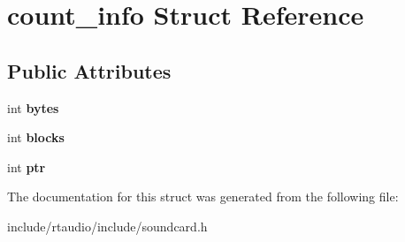 \hypertarget{structcount__info}{}\section{count\+\_\+info Struct Reference}
\label{structcount__info}
\subsection*{Public Attributes}
\begin{DoxyCompactItemize}
\item 
int {\bfseries bytes}\hypertarget{structcount__info_a42e374aa171d142b5d193657cecd6e71}{}\label{structcount__info_a42e374aa171d142b5d193657cecd6e71}

\item 
int {\bfseries blocks}\hypertarget{structcount__info_a181d111d2f9fae6da22c0498a606096b}{}\label{structcount__info_a181d111d2f9fae6da22c0498a606096b}

\item 
int {\bfseries ptr}\hypertarget{structcount__info_ad771784364532dd32769eda24bede3c0}{}\label{structcount__info_ad771784364532dd32769eda24bede3c0}

\end{DoxyCompactItemize}


The documentation for this struct was generated from the following file\+:\begin{DoxyCompactItemize}
\item 
include/rtaudio/include/soundcard.\+h\end{DoxyCompactItemize}

